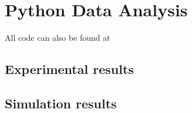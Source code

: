 \chapter{Python Data Analysis}
All code can also be found at\\

\section{Experimental results}


\section{Simulation results}

